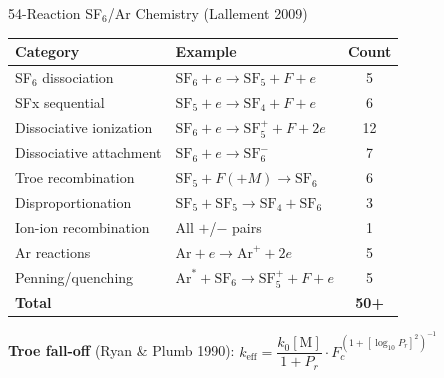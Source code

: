 \documentclass[aspectratio=169,10pt]{beamer}
\newcommand{\SFsix}{\mathrm{SF}_6}
\newcommand{\SFfive}{\mathrm{SF}_5}
\begin{document}
\begin{frame}{54-Reaction SF$_6$/Ar Chemistry (Lallement 2009)}
  \footnotesize
  \begin{center}
    \begin{tabular}{@{}llc@{}}
      \toprule
      \textbf{Category} & \textbf{Example} & \textbf{Count} \\
      \midrule
      SF$_6$ dissociation & $\SFsix + e \to \SFfive + F + e$ & 5 \\
      SFx sequential & $\SFfive + e \to \mathrm{SF}_4 + F + e$ & 6 \\
      Dissociative ionization & $\SFsix + e \to \SFfive^+ + F + 2e$ & 12 \\
      Dissociative attachment & $\SFsix + e \to \SFsix^-$ & 7 \\
      Troe recombination & $\SFfive + F (+M) \to \SFsix$ & 6 \\
      Disproportionation & $\SFfive + \SFfive \to \mathrm{SF}_4 + \SFsix$ & 3 \\
      Ion-ion recombination & All $+$/$-$ pairs & 1 \\
      Ar reactions & $\mathrm{Ar} + e \to \mathrm{Ar}^+ + 2e$ & 5 \\
      Penning/quenching & $\mathrm{Ar}^* + \SFsix \to \SFfive^+ + F + e$ & 5 \\
      \midrule
      \textbf{Total} & & \textbf{50+} \\
      \bottomrule
    \end{tabular}
  \end{center}
  \vspace{0.2cm}
  \normalsize
  \textbf{Troe fall-off} (Ryan \& Plumb 1990): $k_\text{eff} = \dfrac{k_0[\mathrm{M}]}{1+P_r} \cdot F_c^{\left(1+[\log_{10} P_r]^2\right)^{-1}}$
\end{frame}
\end{document}
